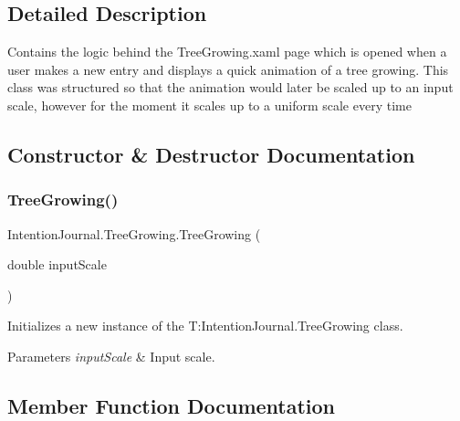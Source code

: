 \subsection{Detailed Description}
Contains the logic behind the Tree\+Growing.\+xaml page which is opened when a user makes a new entry and displays a quick animation of a tree growing. This class was structured so that the animation would later be scaled up to an input scale, however for the moment it scales up to a uniform scale every time 



\subsection{Constructor \& Destructor Documentation}
\mbox{\label{class_intention_journal_1_1_tree_growing_a00c6f397863757f49894e4d6e34ef0a7}} 
\subsubsection{\texorpdfstring{Tree\+Growing()}{TreeGrowing()}}
{\footnotesize\ttfamily Intention\+Journal.\+Tree\+Growing.\+Tree\+Growing (\begin{DoxyParamCaption}\item[{double}]{input\+Scale }\end{DoxyParamCaption})\hspace{0.3cm}{\ttfamily [inline]}}



Initializes a new instance of the T\+:\+Intention\+Journal.\+Tree\+Growing class. 


\begin{DoxyParams}{Parameters}
{\em input\+Scale} & Input scale.\\
\hline
\end{DoxyParams}


\subsection{Member Function Documentation}
\mbox{\label{class_intention_journal_1_1_tree_growing_a6aeb16fbd96d114be910265df535211f}} 

